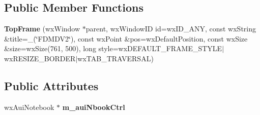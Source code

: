 \subsection*{Public Member Functions}
\begin{DoxyCompactItemize}
\item 
\hypertarget{class_top_frame_af89867621f7fa66c9865f09a1245153c}{{\bfseries Top\-Frame} (wx\-Window $\ast$parent, wx\-Window\-I\-D id=wx\-I\-D\-\_\-\-A\-N\-Y, const wx\-String \&title=\-\_\-(\char`\"{}F\-D\-M\-D\-V2\char`\"{}), const wx\-Point \&pos=wx\-Default\-Position, const wx\-Size \&size=wx\-Size(761, 500), long style=wx\-D\-E\-F\-A\-U\-L\-T\-\_\-\-F\-R\-A\-M\-E\-\_\-\-S\-T\-Y\-L\-E$|$wx\-R\-E\-S\-I\-Z\-E\-\_\-\-B\-O\-R\-D\-E\-R$|$wx\-T\-A\-B\-\_\-\-T\-R\-A\-V\-E\-R\-S\-A\-L)}\label{class_top_frame_af89867621f7fa66c9865f09a1245153c}

\end{DoxyCompactItemize}
\subsection*{Public Attributes}
\begin{DoxyCompactItemize}
\item 
\hypertarget{class_top_frame_af2bf3b05c2e23a16d9b74d8689c83dca}{wx\-Aui\-Notebook $\ast$ {\bfseries m\-\_\-aui\-Nbook\-Ctrl}}\label{class_top_frame_af2bf3b05c2e23a16d9b74d8689c83dca}

\end{DoxyCompactItemize}
